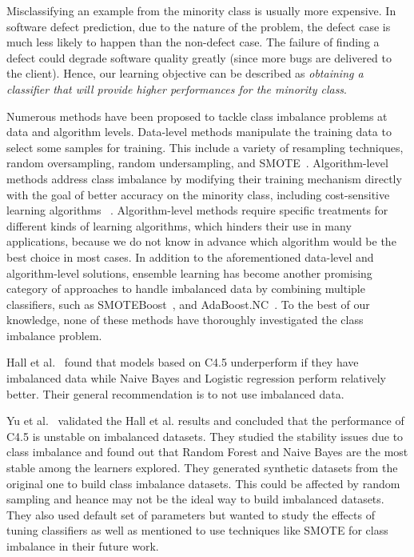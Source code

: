 \documentclass[10pt,conference]{IEEEtran}
\theoremstyle{break}
\theoremstyle{break}
\begin{document}
Misclassifying an example from the minority class is usually more expensive. In software defect prediction, due to the nature of the problem, the defect case is much less likely to happen than the non-defect case.  The failure of finding a defect could degrade software quality greatly (since more bugs
are delivered to the client). Hence,
our learning objective can be described
as \textit{obtaining a classifier that will provide higher performances for the minority class}.

Numerous methods have been proposed to tackle class
imbalance problems at data and algorithm levels. Data-level methods manipulate the training data to select some samples for training. This
include a variety of resampling techniques, random oversampling, random undersampling, and SMOTE~\cite{estabrooks2004multiple}. Algorithm-level methods address class imbalance by modifying their training mechanism directly with the 
goal of better accuracy on the minority class, including cost-sensitive learning algorithms ~\cite{he2009learning}.
Algorithm-level methods require specific treatments for different
kinds of learning algorithms, which hinders their use
in many applications, because we do not know in advance
which algorithm would be the best choice in most cases. In addition to the aforementioned data-level and algorithm-level solutions, ensemble learning has become another promising category of approaches to handle imbalanced data by combining multiple classifiers, such as SMOTEBoost~\cite{chawla2003smoteboost}, and
AdaBoost.NC~\cite{wang2010negative}. To 
the best of our knowledge, none of these methods have  thoroughly investigated the class imbalance problem.

Hall et al.~\cite{hall2012systematic} found that models based on C4.5 underperform if they have imbalanced data while Naive Bayes and Logistic regression perform relatively better. 
Their general recommendation is to not use
imbalanced data.  

Yu et al.~\cite{yuperformance} validated the Hall et al. results and concluded that the
performance of C4.5 is unstable on imbalanced datasets. They studied the stability issues due to  class imbalance and found out that Random Forest and Naive Bayes are the most stable among the learners explored. They generated synthetic datasets from the original one to build class imbalance datasets. This could be affected by random sampling and heance may not be the ideal way to build imbalanced datasets. They also used default set of parameters but wanted to study the effects of tuning classifiers as well as mentioned to use techniques like SMOTE for class imbalance in their future work.
\end{document}
